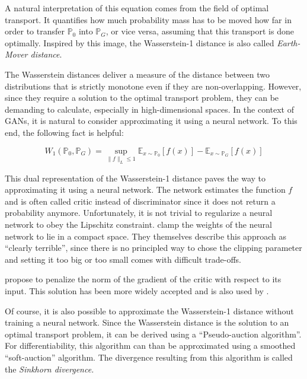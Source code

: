 A natural interpretation of this equation comes from the field of optimal transport.
It quantifies how much probability mass has to be moved how far in order to transfer $\mathbb{P}_0$ into $\mathbb{P}_G$, or vice versa, assuming that this transport is done optimally.
Inspired by this image, the Wasserstein-1 distance is also called \textit{Earth-Mover distance}.

The Wasserstein distances deliver a measure of the distance between two distributions that is strictly monotone even if they are non-overlapping. %
However, since they require a solution to the optimal transport problem, they can be demanding to calculate, especially in high-dimensional spaces. %
In the context of GANs, it is natural to consider approximating it using a neural network.
To this end, the following fact is helpful:

\begin{theorem}
    \begin{equation}
        W_{1}\left(\mathbb{P}_0, \mathbb{P}_G\right)=\sup _{\|f\|_L \leq 1} \mathbb{E}_{x \sim \mathbb{P}_0}[f(x)]-\mathbb{E}_{x \sim \mathbb{P}_G}[f(x)]
    \end{equation}
\end{theorem}

This dual representation of the Wasserstein-1 distance paves the way to approximating it using a neural network.
The network estimates the function $f$ and is often called critic instead of discriminator since it does not return a probability anymore.
Unfortunately, it is not trivial to regularize a neural network to obey the Lipschitz constraint.
\Textcite{arjovsky2017wassersteingan} clamp the weights of the neural network to lie in a compact space.
They themselves describe this approach as ``clearly terrible'', since there is no principled way to chose the clipping parameter and setting it too big or too small comes with difficult trade-offs. %

\Textcite{gulrajani2017improvedtrainingwassersteingans} propose to penalize the norm of the gradient of the critic with respect to its input.
This solution has been more widely accepted and is also used by \textcite{athey2021using}.

Of course, it is also possible to approximate the Wasserstein-1 distance without training a neural network.
Since the Wasserstein distance is the solution to an optimal transport problem, it can be derived using a ``Pseudo-auction algorithm''.
For differentiability, this algorithm can than be approximated using a smoothed ``soft-auction'' algorithm.
The divergence resulting from this algorithm is called the \textit{Sinkhorn divergence.} %